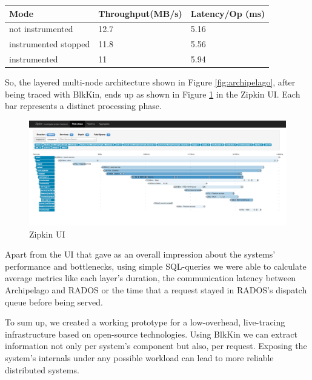 \documentclass[a4paper,10pt,twocolumn]{article}
\begin{document}
\begin{center}
\begin{tabular}{| l | p{3cm} | p{2cm} |}
    \hline
    Mode & Throughput(MB/s) & Latency/Op (ms)  \\ \hline
    not instrumented & 12.7 & 5.16  \\ \hline
    instrumented stopped & 11.8 &  5.56  \\ \hline
    instrumented & 11 & 5.94  \\ 
    \hline
    \end{tabular}
\end{center}

So, the layered multi-node architecture shown in Figure \ref{fig:archipelago},
after being traced with BlkKin, ends up as shown in Figure \ref{fig:zipkin} in
the Zipkin UI. Each bar represents a distinct processing phase.

\begin{center}
\begin{figure}[h!]
  \centering
  \includegraphics[scale=0.15]{images/zipkin.png}
  \caption{Zipkin UI}
  \label{fig:zipkin}
\end{figure}
\end{center}
Apart from the UI that gave as an overall impression about the systems'
performance and bottlenecks, using simple SQL-queries we were able to calculate
average metrics like each layer's duration, the communication latency between
Archipelago and RADOS or the time that a request stayed in RADOS's dispatch
queue before being served.   

To sum up, we created a working prototype for a low-overhead, live-tracing
infrastructure based on open-source technologies. Using BlkKin we can extract
information not only per system's component but also, per request. Exposing the
system's internals under any possible workload can lead to more reliable
distributed systems.



\end{document}
